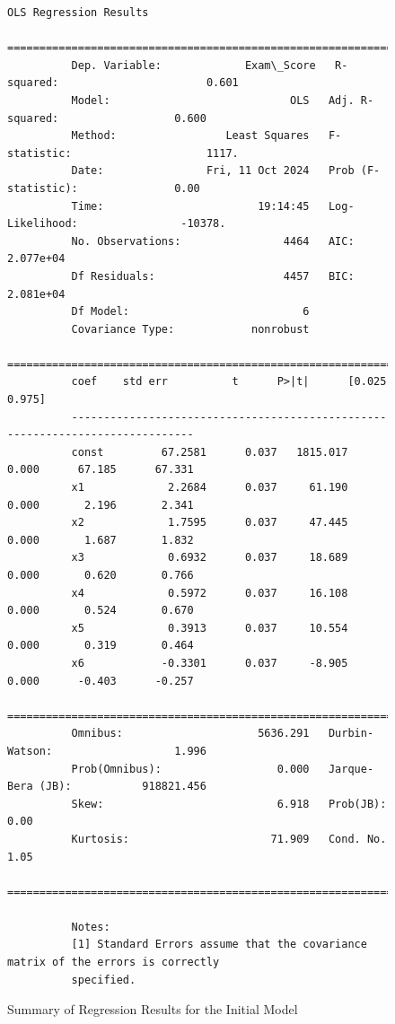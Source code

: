 \documentclass[twocolumn]{article} %
\begin{document}
\begin{figure}[ht]
  \centering
  \begin{Verbatim}[commandchars=\\\{\}]
                                      OLS Regression Results
          ==============================================================================
          Dep. Variable:             Exam\_Score   R-squared:                       0.601
          Model:                            OLS   Adj. R-squared:                  0.600
          Method:                 Least Squares   F-statistic:                     1117.
          Date:                Fri, 11 Oct 2024   Prob (F-statistic):               0.00
          Time:                        19:14:45   Log-Likelihood:                -10378.
          No. Observations:                4464   AIC:                         2.077e+04
          Df Residuals:                    4457   BIC:                         2.081e+04
          Df Model:                           6
          Covariance Type:            nonrobust
          ==============================================================================
          coef    std err          t      P>|t|      [0.025      0.975]
          ------------------------------------------------------------------------------
          const         67.2581      0.037   1815.017      0.000      67.185      67.331
          x1             2.2684      0.037     61.190      0.000       2.196       2.341
          x2             1.7595      0.037     47.445      0.000       1.687       1.832
          x3             0.6932      0.037     18.689      0.000       0.620       0.766
          x4             0.5972      0.037     16.108      0.000       0.524       0.670
          x5             0.3913      0.037     10.554      0.000       0.319       0.464
          x6            -0.3301      0.037     -8.905      0.000      -0.403      -0.257
          ==============================================================================
          Omnibus:                     5636.291   Durbin-Watson:                   1.996
          Prob(Omnibus):                  0.000   Jarque-Bera (JB):           918821.456
          Skew:                           6.918   Prob(JB):                         0.00
          Kurtosis:                      71.909   Cond. No.                         1.05
          ==============================================================================

          Notes:
          [1] Standard Errors assume that the covariance matrix of the errors is correctly
          specified.
  \end{Verbatim}
  \caption{Summary of Regression Results for the Initial Model}
  \label{fig:initial-model-summary}
\end{figure}
\end{document}
